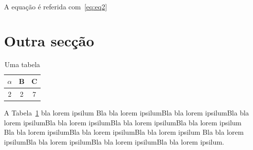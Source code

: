 A equação é referida com~\eqref{eq:eq2}

\section{Outra secção}

\begin{table}
  {\centering
  \begin{tabular}{c|c|c}
    $\alpha$ & B & C \\    \hline
    2 & 2 & 7
  \end{tabular}\caption{Uma tabela}\label{tab:tabela2}
  \par}
\end{table}


A Tabela~\ref{tab:tabela2} bla lorem ipsilum Bla bla lorem ipsilumBla bla lorem ipsilumBla bla
lorem ipsilumBla bla lorem ipsilumBla bla lorem ipsilumBla bla lorem
ipsilum Bla bla lorem ipsilumBla bla lorem ipsilumBla bla lorem ipsilum
Bla bla lorem ipsilumBla bla lorem ipsilumBla bla lorem ipsilumBla bla
lorem ipsilum.
